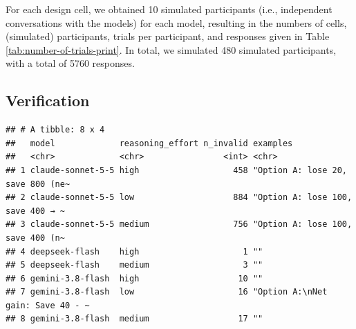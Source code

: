 \documentclass[
]{article}
\begin{document}
For each design cell, we obtained 10 simulated participants (i.e., independent conversations with the models) for each model, resulting in the numbers of cells, (simulated) participants, trials per participant, and responses given in Table \ref{tab:number-of-trials-print}. In total, we simulated 480 simulated participants, with a total of 5760 responses.

\subsection{Verification}\label{verification}

\begin{verbatim}
## # A tibble: 8 x 4
##   model             reasoning_effort n_invalid examples                         
##   <chr>             <chr>                <int> <chr>                            
## 1 claude-sonnet-5-5 high                   458 "Option A: lose 20, save 800 (ne~
## 2 claude-sonnet-5-5 low                    884 "Option A: lose 100, save 400 → ~
## 3 claude-sonnet-5-5 medium                 756 "Option A: lose 100, save 400 (n~
## 4 deepseek-flash    high                     1 ""                               
## 5 deepseek-flash    medium                   3 ""                               
## 6 gemini-3.8-flash  high                    10 ""                               
## 7 gemini-3.8-flash  low                     16 "Option A:\nNet gain: Save 40 - ~
## 8 gemini-3.8-flash  medium                  17 ""
\end{verbatim}
\end{document}

